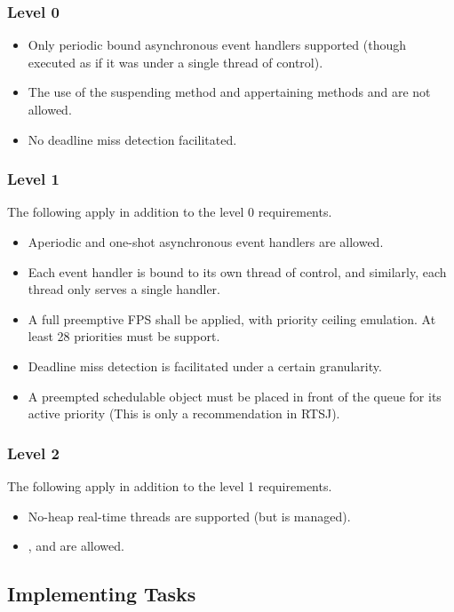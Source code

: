 \subsubsection{Level 0}
\begin{itemize}
	\item Only periodic bound asynchronous event handlers supported (though executed as if it was under a single thread of control).
	\item The use of the suspending method  and appertaining methods  and  are not allowed.
	\item No deadline miss detection facilitated.
\end{itemize}

\subsubsection{Level 1}
The following apply in addition to the level 0 requirements.
\begin{itemize}
	\item Aperiodic and one-shot asynchronous event handlers are allowed.
	\item Each event handler is bound to its own thread of control, and similarly, each thread only serves a single handler.
	\item A full preemptive FPS shall be applied, with priority ceiling emulation. At least 28 priorities must be support.
	\item Deadline miss detection is facilitated under a certain granularity.
	\item A preempted schedulable object must be placed in front of the queue for its active priority (This is only a recommendation in RTSJ).
\end{itemize}

\subsubsection{Level 2}
The following apply in addition to the level 1 requirements.
\begin{itemize}
	\item No-heap real-time threads are supported (but is managed).
	\item {},  and  are allowed.
\end{itemize}


\subsection{Implementing Tasks} %
\label{sub:implementing_tasks}

